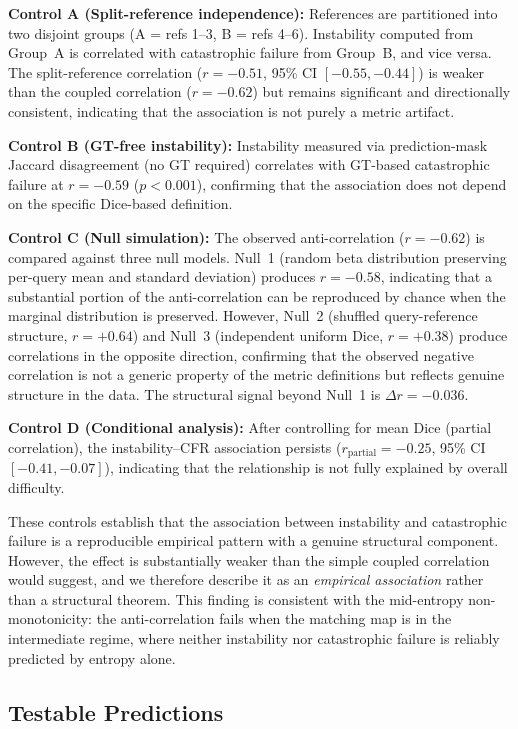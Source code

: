 \documentclass[10pt,twocolumn,letterpaper]{article}
\begin{document}
\textbf{Control A (Split-reference independence):} References are partitioned
into two disjoint groups (A = refs 1--3, B = refs 4--6). Instability computed
from Group~A is correlated with catastrophic failure from Group~B, and vice
versa. The split-reference correlation ($r = -0.51$, 95\% CI $[-0.55, -0.44]$) is weaker
than the coupled correlation ($r = -0.62$) but remains significant and
directionally consistent, indicating that the association is not purely a
metric artifact.

\textbf{Control B (GT-free instability):} Instability measured via
prediction-mask Jaccard disagreement (no GT required) correlates with
GT-based catastrophic failure at $r = -0.59$ ($p < 0.001$), confirming that
the association does not depend on the specific Dice-based definition.

\textbf{Control C (Null simulation):} The observed anti-correlation ($r=-0.62$)
is compared against three null models. Null~1 (random beta distribution
preserving per-query mean and standard deviation) produces $r=-0.58$,
indicating that a substantial portion of the anti-correlation can be
reproduced by chance when the marginal distribution is preserved. However,
Null~2 (shuffled query-reference structure, $r=+0.64$) and Null~3
(independent uniform Dice, $r=+0.38$) produce correlations in the opposite
direction, confirming that the observed negative correlation is not a
generic property of the metric definitions but reflects genuine structure in
the data. The structural signal beyond Null~1 is $\Delta r = -0.036$.

\textbf{Control D (Conditional analysis):} After controlling for mean Dice
(partial correlation), the instability--CFR association persists ($r_{\text{partial}}
= -0.25$, 95\% CI $[-0.41, -0.07]$), indicating that the relationship is not
fully explained by overall difficulty.

These controls establish that the association between instability and
catastrophic failure is a reproducible empirical pattern with a genuine
structural component. However, the effect is substantially weaker than the
simple coupled correlation would suggest, and we therefore describe it as an
\emph{empirical association} rather than a structural theorem. This finding
is consistent with the mid-entropy non-monotonicity: the anti-correlation
fails when the matching map is in the intermediate regime, where neither
instability nor catastrophic failure is reliably predicted by entropy alone.

\subsection{Testable Predictions}
\end{document}
